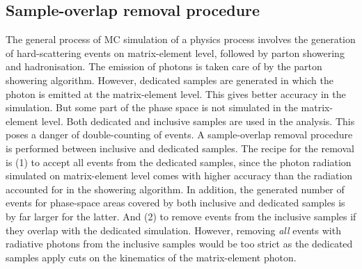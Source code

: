 \subsection{Sample-overlap removal procedure}
\label{sec:sample-overlap-removal}
The general process of MC simulation of a physics process involves the generation of hard-scattering events on matrix-element level, followed by parton showering and hadronisation. The emission of photons is taken care of by the parton showering algorithm. However, dedicated samples are generated in which the photon is emitted at the matrix-element level. This gives better accuracy in the simulation. But some part of the phase space is not simulated in the matrix-element level. Both dedicated and inclusive samples are used in the analysis. This poses a danger of double-counting of events. A sample-overlap removal procedure is performed between inclusive and dedicated samples. The recipe for the removal is (1) to accept all events from the dedicated samples, since the photon radiation simulated on matrix-element level comes with higher accuracy than the radiation accounted for in the showering algorithm. In addition, the generated number of events for phase-space areas covered by both inclusive and dedicated samples is by far larger for the latter. And (2) to remove events from the inclusive samples if they overlap with the dedicated simulation. However, removing \emph{all} events with radiative photons from the inclusive samples would be too strict as the dedicated samples apply cuts on the kinematics of the matrix-element photon.



